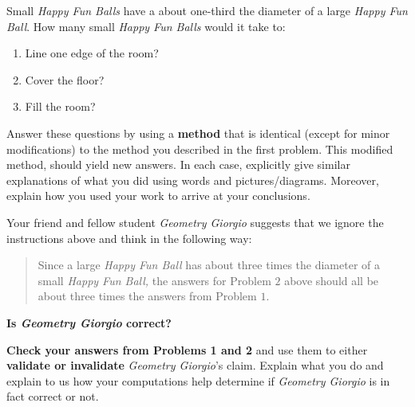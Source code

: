 \documentclass[handout,noauthor,nooutcomes,hints,12pt]{ximera}
\begin{document}
\begin{question}
  Small \textit{Happy Fun Balls} have a about one-third the diameter of a large
  \textit{Happy Fun Ball}. How many small \textit{Happy Fun Balls} would it take
  to:
  \begin{enumerate}
    \item Line one edge of the room?
    \item Cover the floor?
    \item Fill the room?
  \end{enumerate}
  Answer these questions by using a \textbf{method} that is identical (except for minor modifications) to the method you described in the first problem. This modified method, should yield new answers.
  In each case, explicitly give similar explanations of what you did using words and pictures/diagrams. Moreover, explain how you used your work to arrive at your conclusions.
\end{question}
\mynewpage

\begin{question}
  Your friend and fellow student \textit{Geometry Giorgio} suggests
  that we ignore the instructions above and think in the following way:
  \begin{quote}
    Since a large \textit{Happy Fun Ball} has about three times the
    diameter of a small \textit{Happy Fun Ball,} the answers for Problem
    $2$ above should all be about three times the answers from Problem
    $1$.
  \end{quote}
\begin{center}
  \bf Is \textit{Geometry Giorgio} correct?
\end{center}
\textbf{Check your answers from Problems 1 and 2} and use them to either \textbf{validate or invalidate}
\textit{Geometry Giorgio}'s claim. Explain what you do and explain to us how your computations help determine if 
\textit{Geometry Giorgio} is in fact correct or not.
\end{question}
\end{document}
